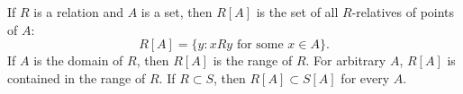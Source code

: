 If $R$ is a relation and $A$ is a set, then $R[A]$ is the set of all $R$-relatives of points of $A$:
$$
R[A] = \{y: xRy \text{ for some } x \in A\}.
$$
If $A$ is the domain of $R$, then $R[A]$ is the range of $R$. For arbitrary $A$, $R[A]$ is contained in the range of $R$. If $R \subset S$, then $R[A] \subset S[A]$ for every $A$.
